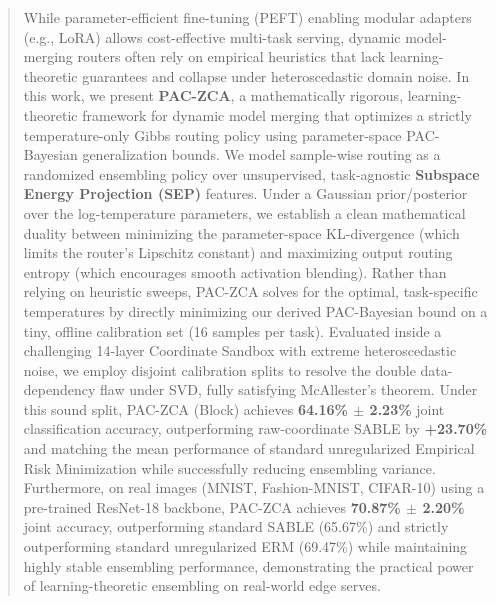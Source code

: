 \begin{abstract}
  While parameter-efficient fine-tuning (PEFT) enabling modular adapters (e.g., LoRA) allows cost-effective multi-task serving, dynamic model-merging routers often rely on empirical heuristics that lack learning-theoretic guarantees and collapse under heteroscedastic domain noise. In this work, we present \textbf{PAC-ZCA}, a mathematically rigorous, learning-theoretic framework for dynamic model merging that optimizes a strictly temperature-only Gibbs routing policy using parameter-space PAC-Bayesian generalization bounds. We model sample-wise routing as a randomized ensembling policy over unsupervised, task-agnostic \textbf{Subspace Energy Projection (SEP)} features. Under a Gaussian prior/posterior over the log-temperature parameters, we establish a clean mathematical duality between minimizing the parameter-space KL-divergence (which limits the router's Lipschitz constant) and maximizing output routing entropy (which encourages smooth activation blending). Rather than relying on heuristic sweeps, PAC-ZCA solves for the optimal, task-specific temperatures by directly minimizing our derived PAC-Bayesian bound on a tiny, offline calibration set (16 samples per task). Evaluated inside a challenging 14-layer Coordinate Sandbox with extreme heteroscedastic noise, we employ disjoint calibration splits to resolve the double data-dependency flaw under SVD, fully satisfying McAllester's theorem. Under this sound split, PAC-ZCA (Block) achieves \textbf{64.16\% $\pm$ 2.23\%} joint classification accuracy, outperforming raw-coordinate SABLE by \textbf{+23.70\%} and matching the mean performance of standard unregularized Empirical Risk Minimization while successfully reducing ensembling variance. Furthermore, on real images (MNIST, Fashion-MNIST, CIFAR-10) using a pre-trained ResNet-18 backbone, PAC-ZCA achieves \textbf{70.87\% $\pm$ 2.20\%} joint accuracy, outperforming standard SABLE (65.67\%) and strictly outperforming standard unregularized ERM (69.47\%) while maintaining highly stable ensembling performance, demonstrating the practical power of learning-theoretic ensembling on real-world edge serves.
\end{abstract}
